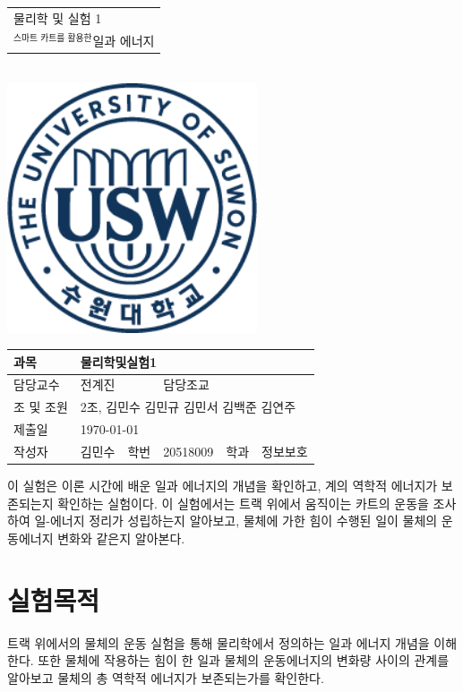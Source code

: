 \documentclass[12pt,a4paper]{article}
\begin{document}
\begin{titlepage}
    \centering
    \begin{tabular}{|C{15cm}|}
        \hline
        \rule{0in}{6ex}
        {\huge 물리학 및 실험 1\par} \\ 
        {\large $^{\textrm{스마트 카트를 활용한}}$일과 에너지\par} \\
        \hline
    \end{tabular} \\
    \vspace{5cm}
    \includegraphics[height=7.36cm]{logo.png}\par
    \vspace{3cm}
    \begin{tabular}{|l|l|l|l|l|l|}
        \hline
        과목 & \multicolumn{5}{l|}{물리학및실험1} \\
        \hline
        담당교수 & \multicolumn{2}{l|}{전계진} & 담당조교 & \multicolumn{2}{l|}{} \\
        \hline
        조 및 조원 & \multicolumn{5}{l|}{2조, 김민수 김민규 김민서 김백준 김연주} \\
        \hline
        제출일 & \multicolumn{5}{l|}{\today} \\
        \hline
        작성자 & 김민수 & 학번 & 20518009 & 학과 & 정보보호 \\
        \hline
    \end{tabular}
\end{titlepage}
이 실험은 이론 시간에 배운 일과 에너지의 개념을 확인하고, 계의 역학적 에너지가
보존되는지 확인하는 실험이다. 이 실험에서는 트랙 위에서 움직이는 카트의 운동을
조사하여 일-에너지 정리가 성립하는지 알아보고, 물체에 가한 힘이 수행된 일이 물체의
운동에너지 변화와 같은지 알아본다.
\section{실험목적}
트랙 위에서의 물체의 운동 실험을 통해 물리학에서 정의하는 일과 에너지 개념을 이해한다.
또한 물체에 작용하는 힘이 한 일과 물체의 운동에너지의 변화량 사이의 관계를 알아보고
물체의 총 역학적 에너지가 보존되는가를 확인한다.
\end{document}
